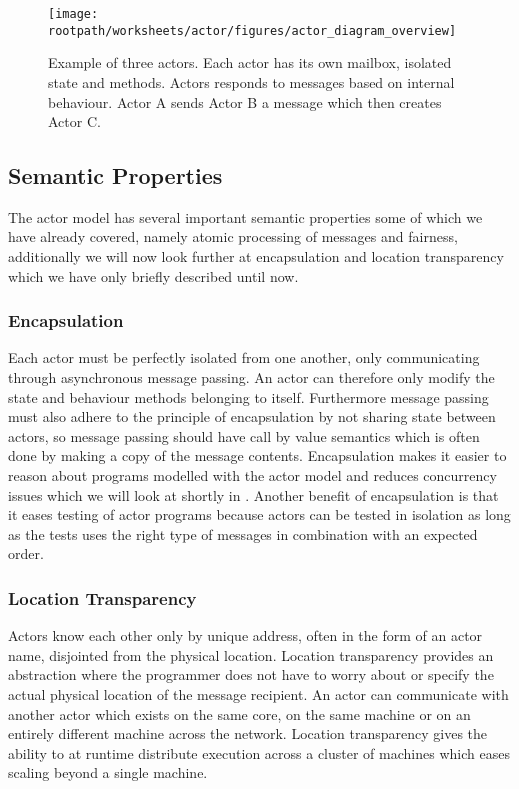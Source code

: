 \begin{figure}[h!]
\centering
\texttt{[image: \\rootpath/worksheets/actor/figures/actor\_diagram\_overview]}
\caption{Example of three actors. Each actor has its own mailbox, isolated state and methods. Actors responds to messages based on internal behaviour. Actor A sends Actor B a message which then creates Actor C.}\label{fig:actor_overview}
\end{figure}

\subsection{Semantic Properties}
The actor model has several important semantic properties some of which we have already covered, namely atomic processing of messages and fairness, additionally we will now look further at encapsulation and location transparency which we have only briefly described until now\cite{karmani2011actors}.

\subsubsection{Encapsulation}
Each actor must be perfectly isolated from one another, only communicating through asynchronous message passing. An actor can therefore only modify the state and behaviour methods belonging to itself. Furthermore message passing must also adhere to the principle of encapsulation by not sharing state between actors, so message passing should have call by value semantics which is often done by making a copy of the message contents\cite[p. 2]{karmani2009actor}. Encapsulation makes it easier to reason about programs modelled with the actor model\cite[p. 3]{karmani2009actor} and reduces concurrency issues which we will look at shortly in . Another benefit of encapsulation is that it eases testing of actor programs because actors can be tested in isolation as long as the tests uses the right type of messages in combination with an expected order\cite[p. 151]{sevenModels}.

\subsubsection{Location Transparency}
Actors know each other only by unique address, often in the form of an actor name, disjointed from the physical location. Location transparency provides an abstraction where the programmer does not have to worry about or specify the actual physical location of the message recipient. An actor can communicate with another actor which exists on the same core, on the same machine or on an entirely different machine across the network\cite[p. 3]{karmani2009actor}. Location transparency gives the ability to at runtime distribute execution across a cluster of machines which eases scaling beyond a single machine.

